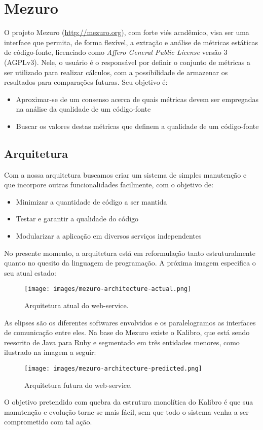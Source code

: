\documentclass[12pt]{article}
\begin{document}
\section{Mezuro}
O projeto Mezuro (\url{http://mezuro.org}), com forte viés acadêmico, visa ser uma interface que permita, de forma flexível, a extração e análise de métricas estáticas de código-fonte, licenciado como \textit{Affero General Public License} versão 3 (AGPLv3). Nele, o usuário é o responsável por definir o conjunto de métricas a ser utilizado para realizar cálculos, com a possibilidade de armazenar os resultados para comparações futuras. Seu objetivo é:
\begin{itemize}
    \item Aproximar-se de um consenso acerca de quais métricas devem ser empregadas na análise da qualidade de um código-fonte
    \item Buscar os valores destas métricas que definem a qualidade de um código-fonte
\end{itemize}
  \subsection{Arquitetura}
  Com a nossa arquitetura buscamos criar um sistema de simples manutenção e que incorpore outras funcionalidades facilmente, com o objetivo de:
  \begin{itemize}
    \item Minimizar a quantidade de código a ser mantida
    \item Testar e garantir a qualidade do código
    \item Modularizar a aplicação em diversos serviços independentes
  \end{itemize}
  No presente momento, a arquitetura está em reformulação tanto estruturalmente quanto no quesito da linguagem de programação.
  A próxima imagem especifica o seu atual estado:
  \begin{figure}[H]
    \centering
      \texttt{[image: images/mezuro-architecture-actual.png]}
    \caption{Arquitetura atual do web-service.}
    \label{fig:architecture-1}
  \end{figure}
  As elipses são os diferentes softwares envolvidos e os paralelogramos as interfaces de comunicação entre eles. Na base do Mezuro existe o Kalibro, que está sendo reescrito
  de Java para Ruby e segmentado em três entidades menores, como ilustrado na imagem a seguir:
  \begin{figure}[H]
    \centering
      \texttt{[image: images/mezuro-architecture-predicted.png]}
    \caption{Arquitetura futura do web-service.}
    \label{fig:architecture-1}
  \end{figure}
  O objetivo pretendido com quebra da estrutura monolítica do Kalibro é que sua manutenção e evolução torne-se mais fácil, sem que todo o sistema venha a ser comprometido com tal ação.
\end{document}
